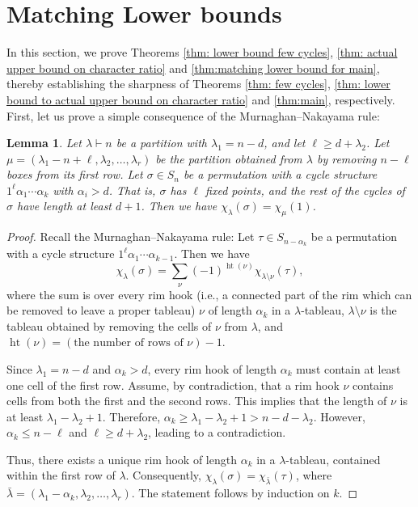 \documentclass[11pt, letterpaper]{amsart}
\newtheorem{lem}[thm]{Lemma}
\renewcommand\ge{\geqslant}
\renewcommand\le{\leqslant}
\newcommand{\htt}{\operatorname{ht}}
\begin{document}
\section{Matching Lower bounds}\label{sec:converse}
In this section, we prove Theorems \ref{thm: lower bound few cycles}, \ref{thm: actual upper bound on character ratio} and \ref{thm:matching lower bound for main}, thereby establishing the sharpness of Theorems \ref{thm: few cycles}, \ref{thm: lower bound to actual upper bound on character ratio} and \ref{thm:main}, respectively. First, let us prove a simple consequence of the Murnaghan--Nakayama rule:
\begin{lem} \label{lem:murnaghan nakayama remove long cycles}
    Let $\lambda \vdash n$ be a partition with $\lambda_1 = n-d$, and let $\ell \ge d + \lambda_2$. Let $\mu = (\lambda_1 - n + \ell, \lambda_2, \ldots, \lambda_r)$ be the partition obtained from $\lambda$ by removing $n-\ell$ boxes from its first row. Let $\sigma \in S_n$ be a permutation with a cycle structure $1^\ell \alpha_1\cdots \alpha_k$ with $\alpha_i > d$. That is, $\sigma$ has $\ell$ fixed points, and the rest of the cycles of $\sigma$ have length at least $d+1$. Then we have $\chi_{\lambda}(\sigma) = \chi_{\mu}(1)$.
\end{lem}
\begin{proof}
    Recall the Murnaghan--Nakayama rule: Let $\tau \in S_{n-\alpha_k}$ be a permutation with a cycle structure $1^\ell \alpha_1\cdots \alpha_{k-1}$. Then we have
    \[
    \chi_{\lambda}(\sigma) = \sum_{\nu} (-1)^{\htt(\nu)} \chi_{\lambda\setminus \nu}(\tau),
    \]
    where the sum is over every rim hook (i.e., a connected part of the rim which can be removed to leave a proper tableau) $\nu$ of length $\alpha_k$ in a $\lambda$-tableau, $\lambda\setminus \nu$ is the tableau obtained by removing the cells of $\nu$ from $\lambda$, and $\htt(\nu) = (\text{the number of rows of $\nu$}) - 1$.
    
    Since $\lambda_1 = n - d$ and $\alpha_k > d$, every rim hook of length $\alpha_k$ must contain at least one cell of the first row. Assume, by contradiction, that a rim hook $\nu$ contains cells from both the first and the second rows. This implies that the length of $\nu$ is at least $\lambda_1 - \lambda_2+1$. Therefore, $\alpha_k \ge \lambda_1 - \lambda_2+1 > n-d-\lambda_2$. However, $\alpha_k \le n-\ell$ and $\ell \ge d+\lambda_2$, leading to a contradiction.

    Thus, there exists a unique rim hook of length $\alpha_k$ in a $\lambda$-tableau, contained within the first row of $\lambda$. Consequently, $\chi_\lambda(\sigma) = \chi_{\bar{\lambda}}(\tau)$, where $\bar{\lambda} = (\lambda_1 - \alpha_k, \lambda_2, \ldots, \lambda_r)$. The statement follows by induction on $k$.
\end{proof}
\end{document}
